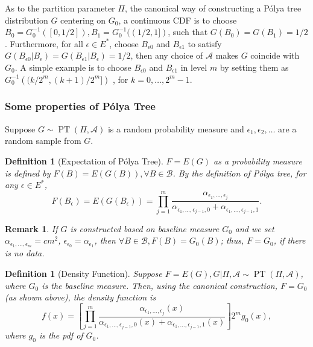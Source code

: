 \documentclass[12pt]{article}
\newtheorem{deff}[thm]{Definition}
\newtheorem{rmk}[thm]{Remark}
\newcommand{\polya}{P\'{o}lya}
\DeclareMathOperator{\pt}{PT}
\begin{document}
As to the partition parameter $\Pi$, the canonical way of constructing
a \polya{} tree distribution $G$ centering on $G_0$, a continuous CDF
is to choose $B_0 = G^{-1}_0 ([0, 1/2]), B_1 = G^{-1}_0 ((1/2,1])$,
such that $G(B_0) = G(B_1)= 1/2$. Furthermore, for all $\epsilon \in
E^{*}$, choose $B_{\epsilon 0 }$ and $B_{\epsilon 1}$ to satisfy 
$G(B_{\epsilon 0 } |B_{\epsilon} ) = G(B_{\epsilon 1} | B_{\epsilon})
= 1/2 $, then any choice of $\mathcal{A} $ makes $G$ coincide with
$G_0$. A simple example is to choose $B_{\epsilon 0} $ and
$B_{\epsilon 1}$ in level $m$ by setting them as $G^{-1}_0 \left(
  (k/2^m, (k+1)/2^m] \right)$ , for $k=0, \ldots, 2^m-1$. 

\subsubsection{Some properties of \polya{} Tree}
Suppose $G \sim \pt (\Pi, \mathcal{A})$ is a random probability
measure and $\epsilon_1, \epsilon_2, \ldots$ are a random sample from $G$. 

\begin{deff}[Expectation of \polya{} Tree]
  $F= E(G)$ as a probability measure is defined by $F(B) = E(G(B)),
  \forall B \in \mathcal{B}$. By the definition of \polya{} tree, for any
  $\epsilon \in E^{*}$, 
  \begin{displaymath}
    F(B_{\epsilon})  = E(G(B_{\epsilon})) = \prod_{j=1}^m
    \frac{\alpha_{\epsilon_1, \ldots, \epsilon_j}}{\alpha_{\epsilon_1,
        \ldots, \epsilon_{j-1},0} + \alpha_{\epsilon_1, \ldots, \epsilon_{j-1},1}}.
  \end{displaymath}
\end{deff}

\begin{rmk}
  If $G$ is constructed based on baseline measure $G_0$ and we set
  $\alpha_{\epsilon_1, \ldots, \epsilon_m} = cm^2 $,
  $\epsilon_{\epsilon_0 }= \alpha_{\epsilon_1}$, then $\forall B \in
  \mathcal{B}, F(B) = G_0(B)$; thus, $F=G_0$, if there is no
  data.
\end{rmk}

\begin{deff}[Density Function]
  Suppose $F=E(G), G|\Pi, \mathcal{A} \sim \pt (\Pi, \mathcal{A})$,
  where $G_0 $ is the baseline measure. Then, using the canonical
  construction, $F=G_0$ (as shown above), the density function is 
  \begin{equation}\label{eq:3}
    f(x) = \left[ \prod_{j=1}^m \frac{ \alpha_{\epsilon_1, \ldots,
          \epsilon_j}(x)}{\alpha_{\epsilon_1, \ldots, \epsilon_{j-1},0}(x)
        + \alpha_{\epsilon_1, \ldots, \epsilon_{j-1},1}(x)} \right] 2^{m } g_0(x),
  \end{equation}
  where $g_0$ is the pdf of $G_0$. 
\end{deff}
\end{document}
